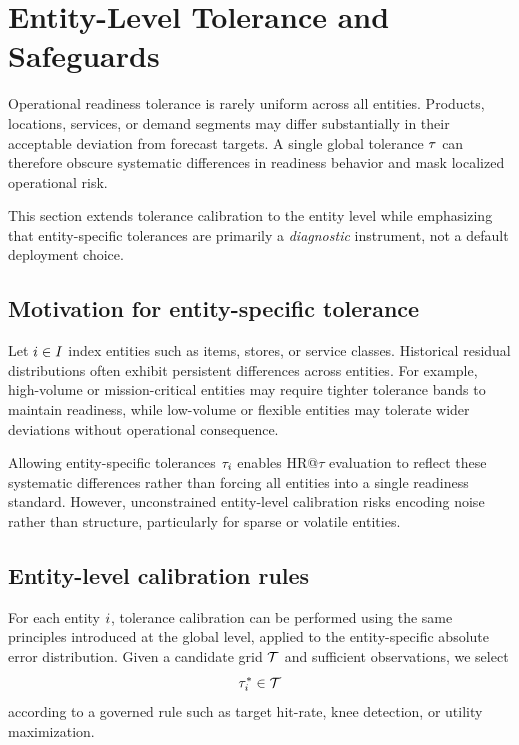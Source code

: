 \section{Entity-Level Tolerance and Safeguards}
\label{sec:entity_level}

Operational readiness tolerance is rarely uniform across all entities.
Products, locations, services, or demand segments may differ substantially in
their acceptable deviation from forecast targets.
A single global tolerance $\tau$ can therefore obscure systematic differences
in readiness behavior and mask localized operational risk.

This section extends tolerance calibration to the entity level while emphasizing
that entity-specific tolerances are primarily a \emph{diagnostic} instrument,
not a default deployment choice.

\subsection{Motivation for entity-specific tolerance}
\label{subsec:entity_motivation}

Let $i \in I$ index entities such as items, stores, or service classes.
Historical residual distributions often exhibit persistent differences across
entities.
For example, high-volume or mission-critical entities may require tighter
tolerance bands to maintain readiness, while low-volume or flexible entities
may tolerate wider deviations without operational consequence.

Allowing entity-specific tolerances $\tau_{i}$ enables HR@$\tau$ evaluation to
reflect these systematic differences rather than forcing all entities into a
single readiness standard.
However, unconstrained entity-level calibration risks encoding noise rather than
structure, particularly for sparse or volatile entities.

\subsection{Entity-level calibration rules}
\label{subsec:entity_calibration}

For each entity $i$, tolerance calibration can be performed using the same
principles introduced at the global level, applied to the entity-specific
absolute error distribution.
Given a candidate grid $\mathcal{T}$ and sufficient observations, we select
\[
    \tau^{\ast}_{i} \in \mathcal{T}
\]
according to a governed rule such as target hit-rate, knee detection, or utility
maximization.

